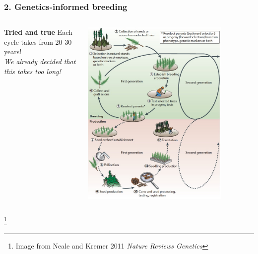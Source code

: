 \documentclass[xcolor=dvipsnames]{beamer}
\newcommand\blfootnote[1]{%
	\begingroup
	\renewcommand\thefootnote{}\footnote{#1}%
	\addtocounter{footnote}{-1}%
	\endgroup
}
\begin{document}
\begin{frame}
\frametitle{2. Genetics-informed breeding}
	\begin{columns}
		\begin{column}{0.4\textwidth}

	\textbf{Tried and true}		
	Each cycle takes from 20-30 years!\\
	
	\vspace{30pt}
	\textit{We already decided that this takes too long!}
	
	
\end{column}
		\begin{column}{0.65\textwidth}
			\centering 	\includegraphics[keepaspectratio, width  = 0.8\textwidth]{img/treeImprovement}
		\end{column}

	\end{columns}
	\blfootnote{Image from Neale and Kremer 2011 \textit{Nature Reviews Genetics}}
\end{frame}
\end{document}
